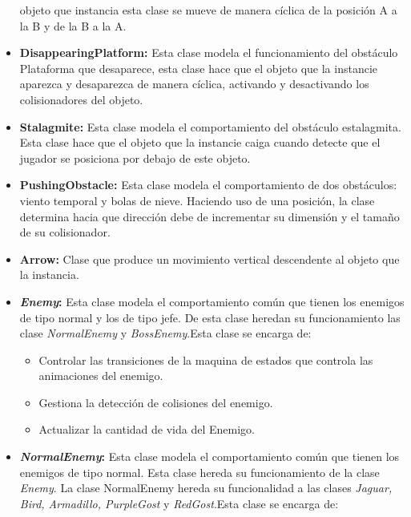 \begin{itemize}
			objeto que instancia esta clase se mueve de manera cíclica de la posición A a 
			la B y de la B a la A. 
			\item \textbf{DisappearingPlatform:} Esta clase modela el funcionamiento 
			del obstáculo Plataforma que desaparece, esta clase hace que el objeto que la 
			instancie aparezca y desaparezca de manera cíclica, activando y desactivando 
			los colisionadores del objeto. 
			\item \textbf{Stalagmite:} Esta clase modela el comportamiento del obstáculo 
			estalagmita. Esta clase hace que el objeto que la instancie caiga cuando 
			detecte que el jugador se posiciona por debajo de este objeto.    
			\item \textbf{PushingObstacle:} Esta clase modela el comportamiento de dos 
			obstáculos: viento temporal y bolas de nieve. Haciendo uso de una posición, la
			clase determina hacia que dirección debe de incrementar su dimensión y el tamaño 
			de su colisionador.      
			\item \textbf{Arrow:} Clase que produce un movimiento vertical descendente al 
			objeto que la instancia.   
			\item \textbf{\textit{Enemy}:} Esta clase modela el comportamiento común que 
			tienen los enemigos de tipo normal y los de tipo jefe. De esta clase heredan 
			su funcionamiento las clase \textit{NormalEnemy} y \textit{BossEnemy}.Esta 
			clase se encarga de:  
			\begin{itemize}
				\item Controlar las transiciones de la maquina de estados que controla las 
				animaciones del enemigo.
				\item Gestiona la detección de colisiones del enemigo.
				\item Actualizar la cantidad de vida del Enemigo.
			\end{itemize}
			\item \textbf{\textit{NormalEnemy}:} Esta clase modela el comportamiento común que 
			tienen los enemigos de tipo normal. Esta clase hereda su funcionamiento de la clase
			 \textit{Enemy}. La clase NormalEnemy hereda su funcionalidad a las clases 
			\textit{ Jaguar, Bird, Armadillo, PurpleGost} y \textit{RedGost}.Esta 
			clase se encarga de:  
			\begin{itemize}

\end{itemize}
\end{itemize}
